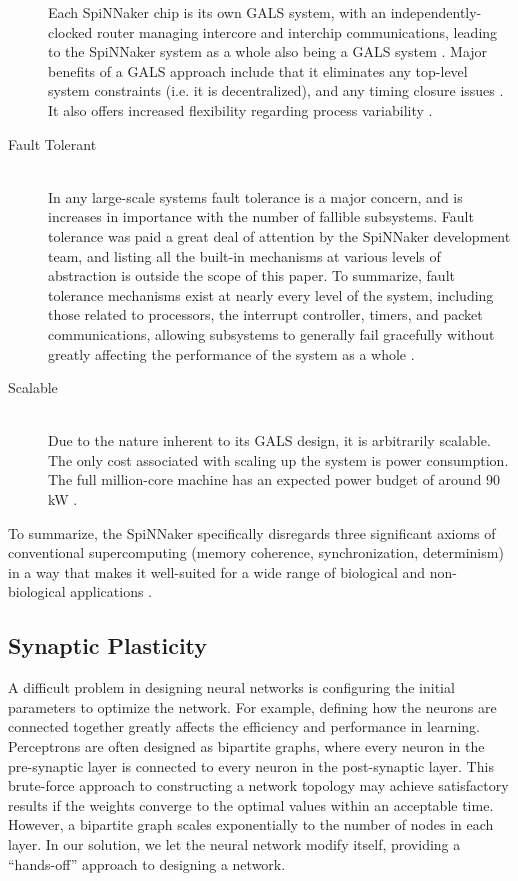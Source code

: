 \documentclass[journal]{./sty/IEEEtran}
\begin{document}
\begin{description}
Each SpiNNaker chip is its own GALS system, with an independently-clocked router managing 
intercore and interchip communications, leading to the SpiNNaker system as a whole also 
being a GALS system \cite{BioMPA:Furber}. 
Major benefits of a GALS approach include that it eliminates any top-level 
system constraints (i.e. it is decentralized), 
and any timing closure issues \cite{GALS:Plana}. 
It also offers increased flexibility regarding process variability \cite{BioMPA:Furber}.
\item[Fault Tolerant] \hfill \\ 
In any large-scale systems fault tolerance is a major concern, and is increases in importance 
with the number of fallible subsystems. 
Fault tolerance was paid a great deal of attention by the SpiNNaker development team, 
and listing all the built-in mechanisms at various levels of abstraction is outside the scope 
of this paper. 
To summarize, fault tolerance mechanisms exist at nearly every level of the system, 
including those related to processors, 
the interrupt controller, timers, and packet communications, 
allowing subsystems to generally fail gracefully without greatly affecting 
the performance of the system as a whole \cite{ArchOverV:Furber}.
\item[Scalable] \hfill \\ 
Due to the nature inherent to its GALS design, it is arbitrarily scalable. 
The only cost associated with scaling up the system is power consumption. 
The full million-core machine has an expected power budget of around 90 kW \cite{ArchOverV:Furber}.
\end{description}

To summarize, the SpiNNaker specifically disregards three significant axioms of conventional supercomputing (memory coherence, synchronization, determinism) in a way that makes it well-suited for a wide range of biological and non-biological applications \cite{ArchOverV:Furber}.

\subsection{Synaptic Plasticity}
A difficult problem in designing neural networks is configuring the initial parameters to optimize the network.
For example, defining how the neurons are connected together greatly affects the efficiency and performance in learning. \cite{SynGen:Levy}
Perceptrons are often designed as bipartite graphs, where every neuron in the pre-synaptic layer is connected to every neuron in the post-synaptic layer.
This brute-force approach to constructing a network topology may achieve satisfactory results if the weights converge to the optimal values within an acceptable time.
However, a bipartite graph scales exponentially to the number of nodes in each layer. 
In our solution, we let the neural network modify itself, providing a ``hands-off'' approach to designing a network.
\end{document}
